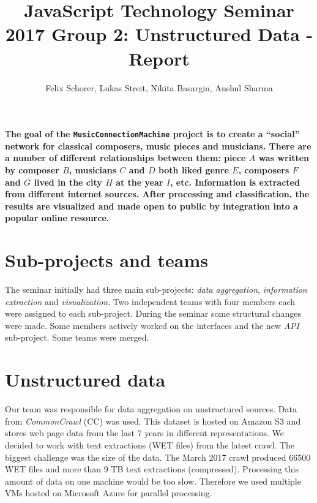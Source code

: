 \documentclass[DIV=calc, paper=a4, fontsize=11pt, twocolumn]{scrartcl}
\title{JavaScript Technology Seminar 2017 Group 2: Unstructured Data - Report}
\author{Felix Schorer, Lukas Streit, Nikita Basargin, Anshul Sharma}
\date{}
\newcommand{\initial}[1]{
\lettrine[lines=3,lhang=0.3,nindent=0em]{
\color{tumblue}
{\textsf{#1}}}{}}
\begin{document}
\newcommand{\undefinedpagestyle}{}
\maketitle
\pagestyle{headings}


\initial{T}\textbf{he goal of the \texttt{MusicConnectionMachine} project is to create a \enquote{social} network for classical composers, music pieces and musicians. 
There are a number of different relationships between them: 
piece $A$ was written by composer $B$, musicians $C$ and $D$ both liked genre $E$, composers $F$ and $G$ lived in the city $H$ at the year $I$, etc. 
Information is extracted from different internet sources. 
After processing and classification, the results are visualized and made open to public by integration into a popular online resource.}


\section*{Sub-projects and teams}
The seminar initially had three main sub-projects: 
\emph{data aggregation}, \emph{information extraction} and \emph{visualization}. 
Two independent teams with four members each were assigned to each sub-project. 
During the seminar some structural changes were made. 
Some members actively worked on the interfaces and the new \emph{API} sub-project. 
Some teams were merged.


\section*{Unstructured data}
Our team was responsible for data aggregation on unstructured sources. 
Data from \emph{CommonCrawl} (CC) was used. 
This dataset is hosted on Amazon S3 and stores web page data from the last 7 years in different representations. 
We decided to work with text extractions (WET files) from the latest crawl. 
The biggest challenge was the size of the data. 
The March 2017 crawl produced 66500 WET files and more than 9 TB text extractions (compressed). 
Processing this amount of data on one machine would be too slow. 
Therefore we used multiple VMs hosted on Microsoft Azure for parallel processing.
\end{document}

